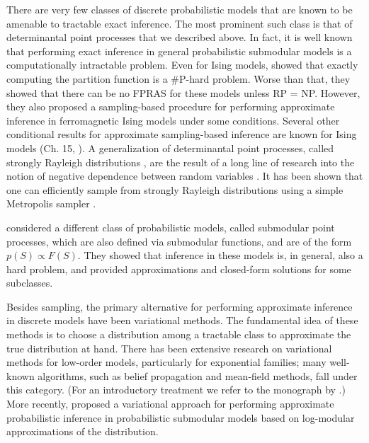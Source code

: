 There are very few classes of discrete probabilistic models that are known to be amenable to tractable exact inference.
The most prominent such class is that of determinantal point processes that we described above.
In fact, it is well known that performing exact inference in general probabilistic submodular models is a computationally intractable problem.
Even for Ising models, \cite{jerrum93} showed that exactly computing the partition function is a \#P-hard problem.
Worse than that, they showed that there can be no FPRAS for these models unless RP = NP.
However, they also proposed a sampling-based procedure for performing approximate inference in ferromagnetic Ising models under some conditions.
Several other conditional results for approximate sampling-based inference are known for Ising models (Ch. 15, \citealp{levin08book}).
A generalization of determinantal point processes, called strongly Rayleigh distributions \citep{borcea08}, are the result of a long line of research into the notion of negative dependence between random variables \citep{pemantle00,liggett02,wagner08}.
It has been shown that one can efficiently sample from strongly Rayleigh distributions using a simple Metropolis sampler \citep{anari16,li16}.

\cite{iyer15} considered a different class of probabilistic models, called submodular point processes, which are also defined via submodular functions, and are of the form $p(S) \propto F(S)$.
They showed that inference in these models is, in general, also a hard problem, and provided approximations and closed-form solutions for some subclasses.

Besides sampling, the primary alternative for performing approximate inference in discrete models have been variational methods.
The fundamental idea of these methods is to choose a distribution among a tractable class to approximate the true distribution at hand.
There has been extensive research on variational methods for low-order models, particularly for exponential families; many well-known algorithms, such as belief propagation and mean-field methods, fall under this category. (For an introductory treatment we refer to the monograph by \cite{wainwright08}.)
More recently, \citet{djolonga14} proposed a variational approach for performing approximate probabilistic inference in probabilistic submodular models based on log-modular approximations of the distribution.


